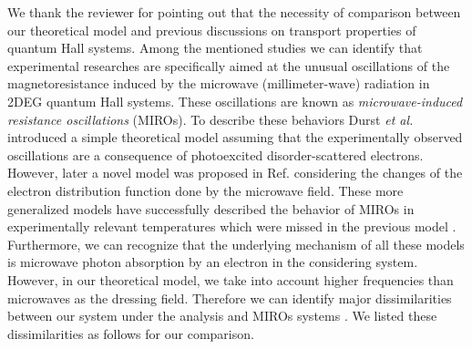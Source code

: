\documentclass{article}
\begin{document}
We thank the reviewer for pointing out that the necessity of comparison between our theoretical model and previous discussions on transport properties of quantum Hall systems.
Among the mentioned studies we can identify that experimental researches \cite{zudov01,mani02,zudov03,mani04} are specifically aimed at the unusual oscillations of the magnetoresistance induced by the microwave (millimeter-wave) radiation in 2DEG quantum Hall systems.
These oscillations are known as \textit{microwave-induced resistance oscillations} (MIROs).
To describe these behaviors Durst \textit{et al.} \cite{durst03} introduced a simple theoretical model assuming that the experimentally observed oscillations are a consequence of photoexcited disorder-scattered electrons.
However, later a novel model was proposed in Ref. \cite{dmitriev03,dmitriev05,dmitriev09} considering the changes of the electron distribution function done by the microwave field.
These more generalized models \cite{dmitriev03,dmitriev05,dmitriev09} have successfully described the behavior of MIROs in experimentally relevant temperatures which were missed in the previous model \cite{durst03}.
Furthermore, we can recognize that the underlying mechanism of all these models \cite{durst03,dmitriev03,dmitriev05,dmitriev09} is microwave photon absorption by an electron in the considering system. However, in our theoretical model, we take into account higher frequencies than microwaves as the dressing field. Therefore we can identify major dissimilarities between our system under the analysis and MIROs systems \cite{zudov01,mani02,zudov03,mani04,durst03,dmitriev03,dmitriev05,dmitriev09}. We listed these dissimilarities as follows for our comparison.
\end{document}
